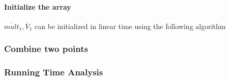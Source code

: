\paragraph{Initialize the array}
$\overline{mult}_1, \overline{V}_1$ can be initialized in linear time using the following algorithm
\subsubsection{Combine two points}
\subsubsection{Running Time Analysis}